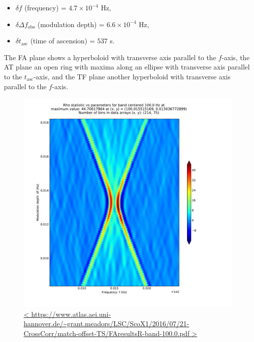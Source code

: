 \documentclass{article}
\begin{document}
\begin{itemize}
    \item $\delta f$ (frequency) = $4.7 \times 10^{-4}$ Hz,
    \item $\delta \Delta f_\mathrm{obs}$ (modulation depth) = $6.6 \times 10^{-4}$ Hz,
    \item $\delta t_\mathrm{asc}$ (time of ascension) = $537$ s.
\end{itemize}

\noindent The FA plane shows a hyperboloid with transverse axis parallel to the $f$-axis, the AT plane an open ring with maxima along an ellipse with transverse axis parallel to the $t_\mathrm{asc}$-axis, and the TF plane another hyperboloid with transverse axis parallel to the $f$-axis.

\begin{figure}
\begin{center}
\includegraphics[trim= 0 0 0 0, clip, width=0.80\paperwidth,keepaspectratio]{plots/match-offset-TS/FAresultsR-band-100-0.pdf}
\caption{
\url{<
https://www.atlas.aei.uni-hannover.de/~grant.meadors/LSC/ScoX1/2016/07/21-CrossCorr/match-offset-TS/FAresultsR-band-100.0.pdf
>}
}
\label{FAoffsetGraph}
\end{center}
\end{figure}
\end{document}
